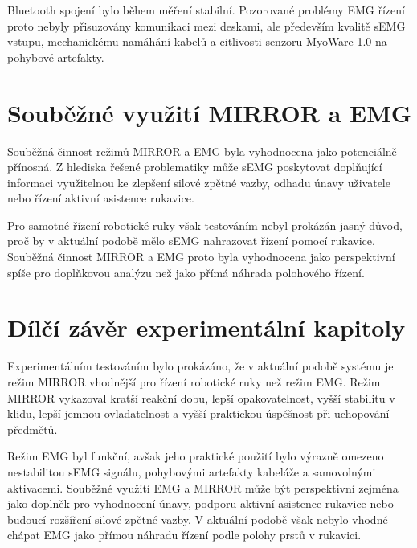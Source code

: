 Bluetooth spojení bylo během měření stabilní. Pozorované problémy EMG řízení proto nebyly přisuzovány komunikaci mezi deskami, ale především kvalitě sEMG vstupu, mechanickému namáhání kabelů a citlivosti senzoru MyoWare 1.0 na pohybové artefakty.

\section{Souběžné využití MIRROR a EMG}
\label{sec:soubezne-vyuziti}

Souběžná činnost režimů MIRROR a EMG byla vyhodnocena jako potenciálně přínosná. Z hlediska řešené problematiky může sEMG poskytovat doplňující informaci využitelnou ke zlepšení silové zpětné vazby, odhadu únavy uživatele nebo řízení aktivní asistence rukavice.

Pro samotné řízení robotické ruky však testováním nebyl prokázán jasný důvod, proč by v aktuální podobě mělo sEMG nahrazovat řízení pomocí rukavice. Souběžná činnost MIRROR a EMG proto byla vyhodnocena jako perspektivní spíše pro doplňkovou analýzu než jako přímá náhrada polohového řízení.

\section{Dílčí závěr experimentální kapitoly}
\label{sec:dilci-zaver-experimenty}

Experimentálním testováním bylo prokázáno, že v aktuální podobě systému je režim MIRROR vhodnější pro řízení robotické ruky než režim EMG\@. Režim MIRROR vykazoval kratší reakční dobu, lepší opakovatelnost, vyšší stabilitu v klidu, lepší jemnou ovladatelnost a vyšší praktickou úspěšnost při uchopování předmětů.

Režim EMG byl funkční, avšak jeho praktické použití bylo výrazně omezeno nestabilitou sEMG signálu, pohybovými artefakty kabeláže a samovolnými aktivacemi. Souběžné využití EMG a MIRROR může být perspektivní zejména jako doplněk pro vyhodnocení únavy, podporu aktivní asistence rukavice nebo budoucí rozšíření silové zpětné vazby. V aktuální podobě však nebylo vhodné chápat EMG jako přímou náhradu řízení podle polohy prstů v rukavici.


